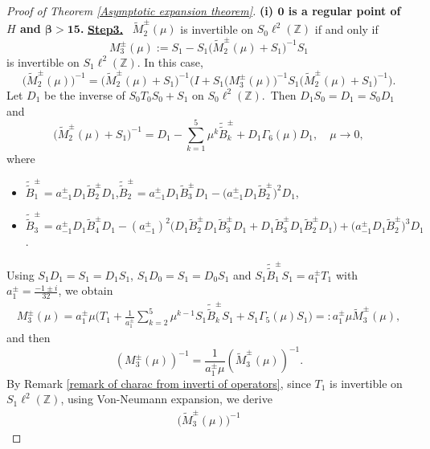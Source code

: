 \documentclass[10pt,a4paper]{amsart}
\newcommand\Z{\mathbb{Z}}
\numberwithin{equation}{section}
\begin{document}
\begin{proof}[Proof of Theorem {\rm\ref{Asymptotic expansion theorem}}]{\bf{(i) ${\bm{0}}$ is a regular point of $H$ and {$\bm{\beta>15}$}.}}
\vskip0.1cm
{\bf{\underline{Step3.}}} \ $\widetilde{M}_{2}^{\pm}(\mu)$ is invertible on $S_0\ell^{2}(\Z)$ if and only if $$ M^{\pm}_{3}(\mu):=S_1-S_1\big(\widetilde{M}_{2}^{\pm}(\mu)+S_1\big)^{-1}S_1$$ is invertible on $S_1\ell^{2}(\Z)$. In this case,
\begin{equation}\label{Relat of M2 tuta and M3}
\big(\widetilde{M}_{2}^{\pm}(\mu)\big)^{-1}=\big(\widetilde{M}_{2}^{\pm}(\mu)+S_1\big)^{-1}\Big(I+S_1\big(M^{\pm}_{3}(\mu)\big)^{-1}S_1\big(\widetilde{M}_{2}^{\pm}(\mu)+S_1\big)^{-1}\Big).
\end{equation}
Let $D_1$ be the inverse of $S_0T_0S_0+S_1$ on $S_0\ell^2(\Z)$.~Then $D_1S_0=D_1=S_0D_1$ and
\begin{equation}\label{expre of Bpm ttuta}
\big(\widetilde{M}_{2}^{\pm}(\mu)+S_1\big)^{-1}=D_1-\sum\limits_{k=1}^{5}\mu^{k}\tilde{\tilde{B}}^{\pm}_{k}+D_1\Gamma_6(\mu)D_1,\quad\mu\rightarrow0,
\end{equation}
where
\begin{itemize}
\item $\tilde{\tilde{B}}^{\pm}_{1}=a^{\pm}_{-1}D_1\widetilde{B}^{\pm}_2D_1$,\quad$\tilde{\tilde{B}}^{\pm}_{2}=a^{\pm}_{-1}D_1\widetilde{B}^{\pm}_3D_1-\big(a^{\pm}_{-1}D_1\widetilde{B}^{\pm}_2\big)^2D_1$,
\vskip0.2cm
\item $\tilde{\tilde{B}}^{\pm}_{3}=a^{\pm}_{-1}D_1\widetilde{B}^{\pm}_4D_1-{(a^{\pm}_{-1})}^2\big(D_1\widetilde{B}^{\pm}_2D_1\widetilde{B}^{\pm}_3D_1+D_1\widetilde{B}^{\pm}_3D_1\widetilde{B}^{\pm}_2D_1\big)+\big(a^{\pm}_{-1}D_1\widetilde{B}^{\pm}_2\big)^3D_1$.
\end{itemize}
Using $S_1D_1=S_1=D_1S_1$, $S_1D_0=S_1=D_0S_1$ and $S_1\tilde{\tilde{B}}^{\pm}_{1}S_1=a^{\pm}_{1}T_1$ with $a^{\pm}_{1}=\frac{-1\pm i}{32}$, we obtain
\begin{align*}
M^{\pm}_3(\mu)=a^{\pm}_{1}\mu\Big(T_1+\frac{1}{a^{\pm}_{1}}\sum\limits_{k=2}^{5}\mu^{k-1}S_1\tilde{\tilde{B}}^{\pm}_{k}S_1+S_1\Gamma_5(\mu)S_1\Big)=:a^{\pm}_{1}\mu\widetilde{M}^{\pm}_3(\mu),
\end{align*}
and then
\begin{equation}\label{Relat of M3 and M3 tuta}
\left(M^{\pm}_3(\mu)\right)^{-1}=\frac{1}{a^{\pm}_{1}\mu}\left(\widetilde{M}_{3}^{\pm}(\mu)\right)^{-1}.
\end{equation}
By Remark \ref{remark of charac from inverti of operators}, since $T_1$ is invertible on $S_1\ell^2(\Z)$, using Von-Neumann expansion, we derive
\begin{align}\label{inverse of Mtuta3}
\big(\widetilde{M}_{3}^{\pm}(\mu)\big)^{-1}

\end{align}
\end{proof}
\end{document}
